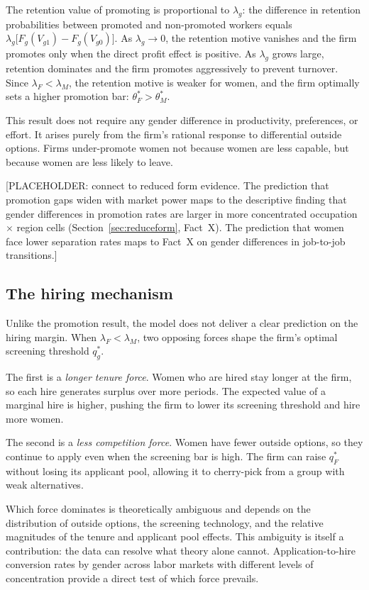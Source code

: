 \documentclass[11pt]{article}
\begin{document}
The retention value of promoting is proportional to $\lambda_g$: the difference in retention probabilities between promoted and non-promoted workers equals $\lambda_g \bigl[F_g(V_{g1}) - F_g(V_{g0})\bigr]$. As $\lambda_g \to 0$, the retention motive vanishes and the firm promotes only when the direct profit effect is positive. As $\lambda_g$ grows large, retention dominates and the firm promotes aggressively to prevent turnover. Since $\lambda_F < \lambda_M$, the retention motive is weaker for women, and the firm optimally sets a higher promotion bar: $\theta_F^* > \theta_M^*$.

This result does not require any gender difference in productivity, preferences, or effort. It arises purely from the firm's rational response to differential outside options. Firms under-promote women not because women are less capable, but because women are less likely to leave.

[PLACEHOLDER: connect to reduced form evidence. The prediction that promotion gaps widen with market power maps to the descriptive finding that gender differences in promotion rates are larger in more concentrated occupation $\times$ region cells (Section~\ref{sec:reduceform}, Fact~X). The prediction that women face lower separation rates maps to Fact~X on gender differences in job-to-job transitions.]

\subsection{The hiring mechanism}

Unlike the promotion result, the model does not deliver a clear prediction on the hiring margin. When $\lambda_F < \lambda_M$, two opposing forces shape the firm's optimal screening threshold $q_g^*$.

The first is a \textit{longer tenure force}. Women who are hired stay longer at the firm, so each hire generates surplus over more periods. The expected value of a marginal hire is higher, pushing the firm to lower its screening threshold and hire more women.

The second is a \textit{less competition force}. Women have fewer outside options, so they continue to apply even when the screening bar is high. The firm can raise $q_F^*$ without losing its applicant pool, allowing it to cherry-pick from a group with weak alternatives.

Which force dominates is theoretically ambiguous and depends on the distribution of outside options, the screening technology, and the relative magnitudes of the tenure and applicant pool effects. This ambiguity is itself a contribution: the data can resolve what theory alone cannot. Application-to-hire conversion rates by gender across labor markets with different levels of concentration provide a direct test of which force prevails.
\end{document}
